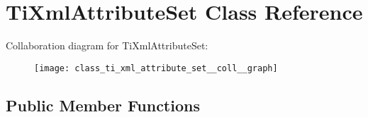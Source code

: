 \hypertarget{class_ti_xml_attribute_set}{\section{\-Ti\-Xml\-Attribute\-Set \-Class \-Reference}
\label{class_ti_xml_attribute_set}
}


\-Collaboration diagram for \-Ti\-Xml\-Attribute\-Set\-:
\nopagebreak
\begin{figure}[H]
\begin{center}
\leavevmode
\texttt{[image: class\_ti\_xml\_attribute\_set\_\_coll\_\_graph]}
\end{center}
\end{figure}
\subsection*{\-Public \-Member \-Functions}
